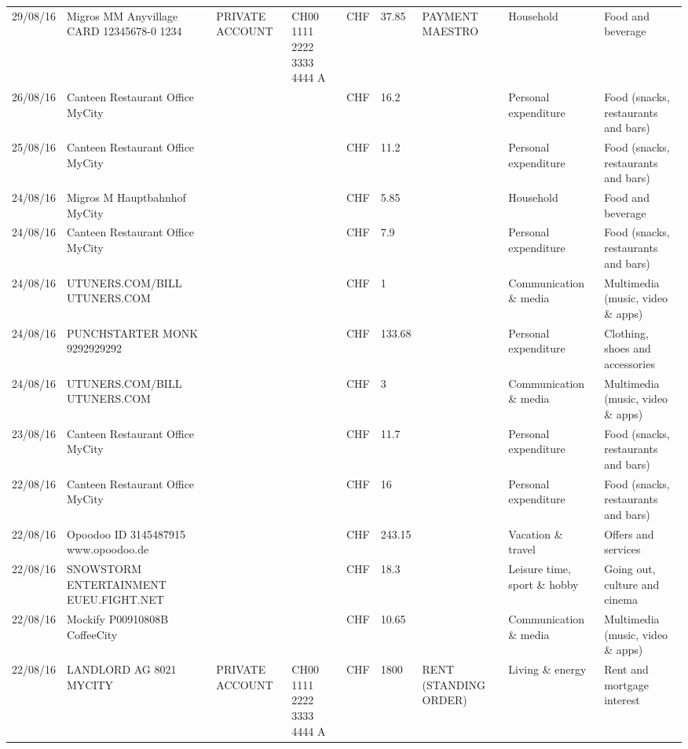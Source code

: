 \begin{landscape}
\begin{center}
\begin{longtable}{lllllllll}
		29/08/16 & Migros MM Anyvillage CARD 12345678-0 1234 & PRIVATE ACCOUNT & CH00 1111 2222 3333 4444 A & CHF   & 37.85 & PAYMENT MAESTRO & Household & Food and beverage \\
		26/08/16 & Canteen Restaurant Office      MyCity &       &       & CHF   & 16.2  &       & Personal expenditure & Food (snacks, restaurants and bars) \\
		25/08/16 & Canteen Restaurant Office      MyCity &       &       & CHF   & 11.2  &       & Personal expenditure & Food (snacks, restaurants and bars) \\
		24/08/16 & Migros M Hauptbahnhof    MyCity &       &       & CHF   & 5.85  &       & Household & Food and beverage \\
		24/08/16 & Canteen Restaurant Office      MyCity &       &       & CHF   & 7.9   &       & Personal expenditure & Food (snacks, restaurants and bars) \\
		24/08/16 & UTUNERS.COM/BILL          UTUNERS.COM &       &       & CHF   & 1     &       & Communication \& media & Multimedia (music, video \& apps) \\
		24/08/16 & PUNCHSTARTER MONK   9292929292 &       &       & CHF   & 133.68 &       & Personal expenditure & Clothing, shoes and accessories \\
		24/08/16 & UTUNERS.COM/BILL          UTUNERS.COM &       &       & CHF   & 3     &       & Communication \& media & Multimedia (music, video \& apps) \\
		23/08/16 & Canteen Restaurant Office      MyCity &       &       & CHF   & 11.7  &       & Personal expenditure & Food (snacks, restaurants and bars) \\
		22/08/16 & Canteen Restaurant Office      MyCity &       &       & CHF   & 16    &       & Personal expenditure & Food (snacks, restaurants and bars) \\
		22/08/16 & Opoodoo ID 3145487915      www.opoodoo.de &       &       & CHF   & 243.15 &       & Vacation \& travel & Offers and services \\
		22/08/16 & SNOWSTORM ENTERTAINMENT EUEU.FIGHT.NET &       &       & CHF   & 18.3  &       & Leisure time, sport \& hobby & Going out, culture and cinema \\
		22/08/16 & Mockify P00910808B       CoffeeCity &       &       & CHF   & 10.65 &       & Communication \& media & Multimedia (music, video \& apps) \\
		22/08/16 & LANDLORD AG 8021 MYCITY & PRIVATE ACCOUNT & CH00 1111 2222 3333 4444 A & CHF   & 1800  & RENT (STANDING ORDER) & Living \& energy & Rent and mortgage interest \\

\end{longtable}
\end{center}
\end{landscape}
